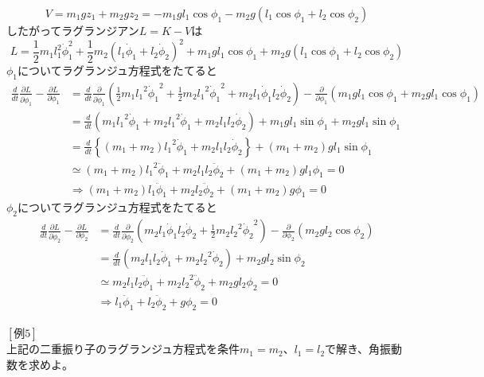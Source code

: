 \documentclass{jsarticle}
\begin{document}
\[V=m_{1}gz_{1}+m_{2}gz_{2}=-m_{1}gl_{1}\cos\phi_{1}-m_{2}g(l_{1}\cos\phi_{1}+l_{2}\cos\phi_{2})\]
したがってラグランジアン\(L=K-V\)は
\[L=\frac{1}{2}m_{1}l_{1}^{2}\dot{\phi}_{1}^{2}+\frac{1}{2}m_{2}(l_{1}\dot{\phi}_{1}+l_{2}\dot{\phi}_{2})^{2}+m_{1}gl_{1}\cos\phi_{1}+m_{2}g(l_{1}\cos\phi_{1}+l_{2}\cos\phi_{2})\]
\(\phi_{1}\)についてラグランジュ方程式をたてると
\begin{align*}
\frac{d}{dt}\frac{\partial L}{\partial\dot{\phi}_{1}}-\frac{\partial L}{\partial\phi_{1}}&=\frac{d}{dt}\frac{\partial}{\partial\dot{\phi}_{1}}\left(\frac{1}{2}m_{1}{l_{1}}^{2}{\dot{\phi}_{1}}^{2}+\frac{1}{2}m_{2}{l_{1}}^{2}{\dot{\phi}_{1}}^{2}+m_{2}l_{1}\dot{\phi}_{1}l_{2}\dot{\phi}_{2}\right)-\frac{\partial}{\partial\phi_{1}}\left(m_{1}gl_{1}\cos\phi_{1}+m_{2}gl_{1}\cos\phi_{1}\right)\\
&=\frac{d}{dt}\left(m_{1}{l_{1}}^{2}\dot{\phi}_{1}+m_{2}{l_{1}}^{2}\dot{\phi}_{1}+m_{2}l_{1}l_{2}\dot{\phi}_{2}\right)+m_{1}gl_{1}\sin\phi_{1}+m_{2}gl_{1}\sin\phi_{1}\\
&=\frac{d}{dt}\left\{(m_{1}+m_{2}){l_{1}}^{2}\dot{\phi}_{1}+m_{2}l_{1}l_{2}\dot{\phi}_{2}\right\}+(m_{1}+m_{2})gl_{1}\sin\phi_{1}\\
&\simeq(m_{1}+m_{2}){l_{1}}^{2}\ddot{\phi}_{1}+m_{2}l_{1}l_{2}\ddot{\phi}_{2}+(m_{1}+m_{2})gl_{1}\phi_{1}=0\\
&\Longrightarrow(m_{1}+m_{2})l_{1}\ddot{\phi}_{1}+m_{2}l_{2}\ddot{\phi}_{2}+(m_{1}+m_{2})g\phi_{1}=0
\end{align*}
\(\phi_{2}\)についてラグランジュ方程式をたてると
\begin{align*}
\frac{d}{dt}\frac{\partial L}{\partial\dot{\phi}_{2}}-\frac{\partial L}{\partial\phi_{2}}&=\frac{d}{dt}\frac{\partial}{\partial\dot{\phi}_{2}}\left(m_{2}l_{1}\dot{\phi}_{1}l_{2}\dot{\phi}_{2}+\frac{1}{2}m_{2}{l_{2}}^{2}{\dot{\phi}_{2}}^{2}\right)-\frac{\partial}{\partial\phi_{2}}\left(m_{2}gl_{2}\cos\phi_{2}\right)\\
&=\frac{d}{dt}\left(m_{2}l_{1}l_{2}\dot{\phi}_{1}+m_{2}{l_{2}}^{2}\dot{\phi}_{2}\right)+m_{2}gl_{2}\sin\phi_{2}\\
&\simeq m_{2}l_{1}l_{2}\ddot{\phi}_{1}+m_{2}{l_{2}}^{2}\ddot{\phi}_{2}+m_{2}gl_{2}\phi_{2}=0\\
&\Longrightarrow l_{1}\ddot{\phi}_{1}+l_{2}\ddot{\phi}_{2}+g\phi_{2}=0
\end{align*}
\\
\([例5]\)\\
上記の二重振り子のラグランジュ方程式を条件\(m_{1}=m_{2}\)、\(l_{1}=l_{2}\)で解き、角振動数を求めよ。\\
\end{document}
